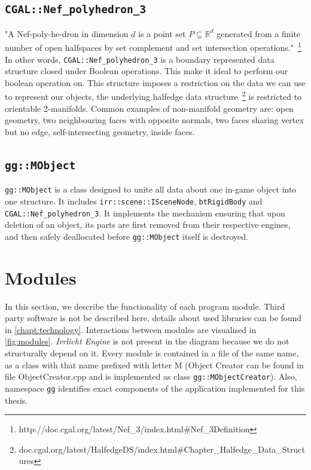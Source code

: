\subsection*{\tt CGAL::Nef\_polyhedron\_3}
\label{sec:nef}
"A Nef-poly-he-dron in dimension $d$ is a point set $P \subseteq \mathbb{R}^d$ generated from a finite number of open halfspaces by set complement and set intersection operations."~\footnote{http://doc.cgal.org/latest/Nef\_3/index.html\#Nef\_3Definition} In other words, {\tt CGAL::Nef\_polyhedron\_3} is a boundary represented data structure closed under Boolean operations. This make it ideal to perform our boolean operation on.
This structure imposes a restriction on the data we can use to represent our objects, the underlying halfedge data structure~\footnote{doc.cgal.org/latest/HalfedgeDS/index.html\#Chapter\_Halfedge\_Data\_Structures} is restricted to orientable 2-manifolds. Common examples of non-manifold geometry are: open geometry, two neighbouring faces with opposite normals, two faces sharing vertex but no edge, self-intersecting geometry, inside faces.

\subsection*{\tt gg::MObject} 
{\tt gg::MObject} is a class designed to unite all data about one in-game object into one structure. It includes {\tt irr::scene::ISceneNode}, {\tt btRigidBody} and {\tt CGAL::Nef\_polyhedron\_3}. It implements the mechanism ensuring that upon deletion of an object, its parts are first removed from their respective engines, and then safely deallocated before {\tt gg::MObject} itself is destroyed.


\section{Modules}
In this section, we describe the functionality of each program module. Third party software is not be described here, details about used libraries can be found in \cref{chapt:technology}. Interactions between modules are visualised in \cref{fig:modules}. \emph{Irrlicht Engine} is not present in the diagram because we do not structurally depend on it. Every module is contained in a file of the same name, as a class with that name prefixed with letter M (\ie Object Creator can be found in file ObjectCreator.cpp and is implemented as class {\tt gg::MObjectCreator}). Also, namespace {\tt gg} identifies exact components of the application implemented for this thesis.

